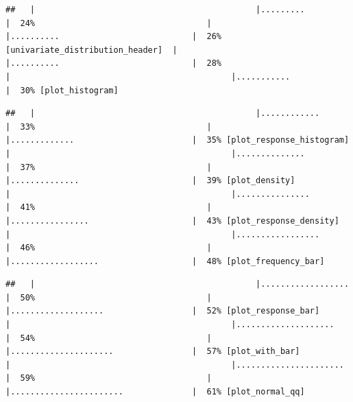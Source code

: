 \documentclass[
]{article}
\begin{document}
\begin{verbatim}
##   |                                             |.........                            |  24%                                   |                                             |..........                           |  26% [univariate_distribution_header]  |                                             |..........                           |  28%                                   |                                             |...........                          |  30% [plot_histogram]
\end{verbatim}

\begin{verbatim}
##   |                                             |............                         |  33%                                   |                                             |.............                        |  35% [plot_response_histogram]         |                                             |..............                       |  37%                                   |                                             |..............                       |  39% [plot_density]                    |                                             |...............                      |  41%                                   |                                             |................                     |  43% [plot_response_density]           |                                             |.................                    |  46%                                   |                                             |..................                   |  48% [plot_frequency_bar]
\end{verbatim}

\begin{verbatim}
##   |                                             |..................                   |  50%                                   |                                             |...................                  |  52% [plot_response_bar]               |                                             |....................                 |  54%                                   |                                             |.....................                |  57% [plot_with_bar]                   |                                             |......................               |  59%                                   |                                             |.......................              |  61% [plot_normal_qq]
\end{verbatim}
\end{document}
